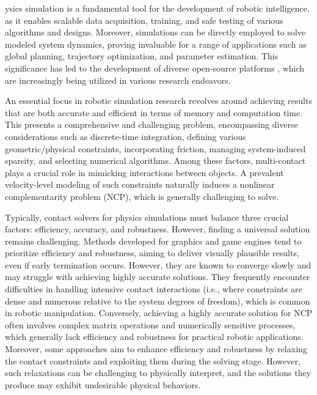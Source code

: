 \documentclass[lettersize,journal]{IEEEtran}
\begin{document}
ysics simulation is a fundamental tool for the development of robotic intelligence, as it enables scalable data acquisition, training, and safe testing of various algorithms and designs. 
Moreover, simulations can be directly employed to solve modeled system dynamics, proving invaluable for a range of applications such as global planning, trajectory optimization, and parameter estimation. 
This significance has led to the development of diverse open-source platforms \cite{bullet,mujoco,physx,brax,RaiSim,sofa}, which are increasingly being utilized in various research endeavors.

An essential focus in robotic simulation research revolves around achieving results that are both accurate and efficient in terms of memory and computation time. This presents a comprehensive and challenging problem, encompassing diverse considerations such as discrete-time integration, defining various geometric/physical constraints, incorporating friction, managing system-induced sparsity, and selecting numerical algorithms. 
Among these factors, multi-contact plays a crucial role in mimicking interactions between objects. A prevalent velocity-level modeling of such constraints \cite{stewart1996implicit} naturally induces a nonlinear complementarity problem (NCP), which is generally challenging to solve.

Typically, contact solvers for physics simulations must balance three crucial factors: efficiency, accuracy, and robustness. However, finding a universal solution remains challenging. 
Methods developed for graphics and game engines tend to prioritize efficiency and robustness, aiming to deliver visually plausible results, even if early termination occurs. However, they are known to converge slowly and may struggle with achieving highly accurate solutions. They frequently encounter difficulties in handling intensive contact interactions (i.e., where constraints are dense and numerous relative to the system degrees of freedom), which is common in robotic manipulation. 
Conversely, achieving a highly accurate solution for NCP often involves complex matrix operations and numerically sensitive processes, which generally lack efficiency and robustness for practical robotic applications. 
Moreover, some approaches aim to enhance efficiency and robustness by relaxing the contact constraints and exploiting them during the solving stage. However, such relaxations can be challenging to physically interpret, and the solutions they produce may exhibit undesirable physical behaviors.
\end{document}
